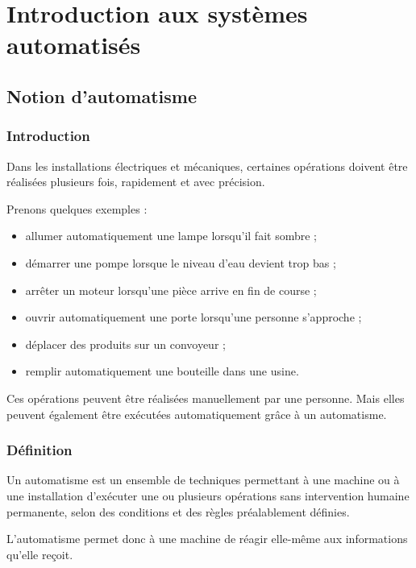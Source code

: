 \documentclass[12pt,a4paper]{book}
\begin{document}
\tableofcontents
\chapter{Introduction aux systèmes automatisés}

\section{Notion d'automatisme}

\subsection{Introduction}

Dans les installations électriques et mécaniques, certaines opérations doivent être réalisées plusieurs fois, rapidement et avec précision.

Prenons quelques exemples :

\begin{itemize}
    \item allumer automatiquement une lampe lorsqu'il fait sombre ;
    \item démarrer une pompe lorsque le niveau d'eau devient trop bas ;
    \item arrêter un moteur lorsqu'une pièce arrive en fin de course ;
    \item ouvrir automatiquement une porte lorsqu'une personne s'approche ;
    \item déplacer des produits sur un convoyeur ;
    \item remplir automatiquement une bouteille dans une usine.
\end{itemize}

Ces opérations peuvent être réalisées manuellement par une personne. Mais elles peuvent également être exécutées automatiquement grâce à un automatisme.

\subsection{Définition}

Un automatisme est un ensemble de techniques permettant à une machine ou à une installation d'exécuter une ou plusieurs opérations sans intervention humaine permanente, selon des conditions et des règles préalablement définies.

L'automatisme permet donc à une machine de réagir elle-même aux informations qu'elle reçoit.
\end{document}
